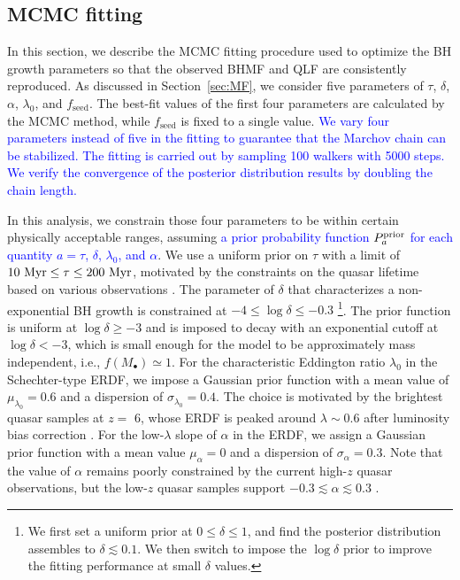 \documentclass[twocolumn, twocolappendix]{aastex63}
\newcommand{\tlife}{\tau}
\newcommand{\fseed}{f_\mathrm{seed}}
\newcommand{\blue}[1]{\textcolor{blue}{ #1}}
\begin{document}
\begin{CJK*}{UTF8}{gbsn}
\vspace{2mm}
\subsection{MCMC fitting}\label{sec:fitting}



In this section, we describe the MCMC fitting procedure used to optimize 
the BH growth parameters so that the observed BHMF and QLF are consistently reproduced. 
As discussed in Section~\ref{sec:MF}, we consider five parameters of $\tlife$, $\delta$, $\alpha$, $\lambda_0$, and $\fseed$.
The best-fit values of the first four parameters are calculated by the MCMC method, while $\fseed$ is fixed to a single value.
\blue{
We vary four parameters instead of five in the fitting to guarantee that the Marchov chain can be stabilized. 
The fitting is carried out by sampling 100 walkers with 5000 steps.
We verify the convergence of the posterior distribution results by doubling the chain length.
}

In this analysis, we constrain those four parameters to be within certain physically acceptable ranges, 
assuming \blue{a prior probability function $P^{\rm prior}_a$ for each quantity $a=\tlife$, $\delta$, $\lambda_0$, and $\alpha$}.
We use a uniform prior on $\tlife$ with a limit of $10~{\rm Myr} \leq \tlife \leq 200~{\rm Myr}$,
motivated by the constraints on the quasar lifetime based on various observations
\citep[e.g.,][]{2004cbhg.symp..169M}.
The parameter of $\delta$ that characterizes a non-exponential BH growth 
is constrained at $-4 \leq \log \delta \leq -0.3$
\footnote{ We first set a uniform prior at $0\leq \delta \leq 1$, 
and find the posterior distribution assembles to $\delta \lesssim 0.1$.
We then switch to impose the $\log \delta$ prior to improve the fitting performance at small $\delta$ values.}.
The prior function is uniform at $\log \delta \geq -3$ and is imposed to decay with an exponential cutoff at $\log \delta < -3$,
which is small enough for the model to be approximately mass independent, i.e., $f(M_\bullet)\simeq1$.
For the characteristic Eddington ratio $\lambda_0$ in the Schechter-type ERDF, 
we impose a Gaussian prior function with a mean value of $\mu_{\lambda_0}=0.6$ and a dispersion of $\sigma_{\lambda_0}=0.4$.
The choice is motivated by the brightest quasar samples at $z=$ 6, whose ERDF is peaked around $\lambda \sim 0.6$ 
after luminosity bias correction \citep[e.g.,][]{2010AJ....140..546W}.
For the low-$\lambda$ slope of $\alpha$ in the ERDF, we assign a Gaussian prior function with a mean value 
$\mu_{\alpha}=0$ and a dispersion of $\sigma_{\alpha}=0.3$.
Note that the value of $\alpha$ remains poorly constrained by the current high-$z$ quasar observations,
but the low-$z$ quasar samples support $-0.3 \lesssim \alpha \lesssim 0.3$ 
\blue{\citep[e.g., see the mass-integrated ERDF for comparison; the right panel of Figure 21 in][]{2015MNRAS.447.2085S}}.



\end{CJK*}
\end{document}
